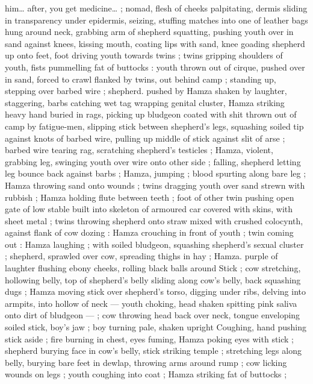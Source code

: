 {him{\ldots} after, you get medicine{\ldots} {\gr} ; nomad, flesh of cheeks palpitating, 
dermis sliding in transparency under epidermis, seizing, stuffing 
matches into one of leather bags hung around neck, grabbing arm of 
shepherd squatting, pushing youth over in sand against knees, 
kissing mouth, coating lips with sand, knee goading shepherd up 
onto feet, foot driving youth towards twins ; twins gripping shoulders 
of youth, fists pummelling fat of buttocks : youth thrown out of 
cirque, pushed over in sand, forced to crawl flanked by twins, out 
behind camp ; standing up, stepping over barbed wire ; shepherd. 
pushed by Hamza shaken by laughter, staggering, barbs catching wet 
tag wrapping genital cluster, Hamza striking heavy hand buried in 
rags, picking up bludgeon coated with shit thrown out of camp by 
fatigue-men, slipping stick between shepherd's legs, squashing 
soiled tip against knots of barbed wire, pulling up middle of stick 
against slit of arse ; barbed wire tearing rag, scratching shepherd's 
testicles ; Hamza, violent, grabbing leg, swinging youth over wire 
onto other side ; falling, shepherd letting leg bounce back against 
barbs ; Hamza, jumping ; blood spurting along bare leg ; Hamza 
throwing sand onto wounds ; twins dragging youth over sand strewn 
with rubbish ; Hamza holding flute between teeth ; foot of other twin 
pushing open gate of low stable built into skeleton of armoured car 
covered with skins, with sheet metal ; twins throwing shepherd onto 
straw mixed with crushed colocynth, against flank of cow dozing : 
Hamza crouching in front of youth ; twin coming out : Hamza 
laughing ; with soiled bludgeon, squashing shepherd's sexual cluster 
; shepherd, sprawled over cow, spreading thighs in hay ; Hamza. 
purple of laughter flushing ebony cheeks, rolling black balls around 
Stick ; cow stretching, hollowing belly, top of shepherd's belly sliding 
along cow's belly, back squashing dugs ; Hamza moving stick over 
shepherd's torso, digging under ribs, delving into armpits, into 
hollow of neck --- youth choking, head shaken spitting pink saliva 
onto dirt of bludgeon --- ; cow throwing head back over neck, tongue 
enveloping soiled stick, boy's jaw ; boy turning pale, shaken upright 
Coughing, hand pushing stick aside ; fire burning in chest, eyes 
fuming, Hamza poking eyes with stick ; shepherd burying face in 
cow's belly, stick striking temple ; stretching legs along belly, burying 
bare feet in dewlap, throwing arms around rump ; cow licking wounds 
on legs ; youth coughing into coat ; Hamza striking fat of buttocks ; 
}
